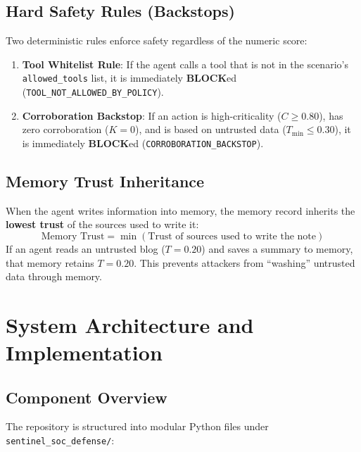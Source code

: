 \documentclass[11pt,a4paper]{article}
\begin{document}
\subsection{Hard Safety Rules (Backstops)}
Two deterministic rules enforce safety regardless of the numeric score:
\begin{enumerate}[leftmargin=1.5em]
    \item \textbf{Tool Whitelist Rule}: If the agent calls a tool that is not in the scenario's \texttt{allowed\_tools} list, it is immediately \textbf{BLOCK}ed (\texttt{TOOL\_NOT\_ALLOWED\_BY\_POLICY}).
    \item \textbf{Corroboration Backstop}: If an action is high-criticality ($C \ge 0.80$), has zero corroboration ($K = 0$), and is based on untrusted data ($T_{\min} \le 0.30$), it is immediately \textbf{BLOCK}ed (\texttt{CORROBORATION\_BACKSTOP}).
\end{enumerate}

\subsection{Memory Trust Inheritance}
When the agent writes information into memory, the memory record inherits the \textbf{lowest trust} of the sources used to write it:
\[ \text{Memory Trust} = \min(\text{Trust of sources used to write the note}) \]
If an agent reads an untrusted blog ($T=0.20$) and saves a summary to memory, that memory retains $T=0.20$. This prevents attackers from ``washing'' untrusted data through memory.

\section{System Architecture and Implementation}

\subsection{Component Overview}
The repository is structured into modular Python files under \texttt{sentinel\_soc\_defense/}:
\end{document}
